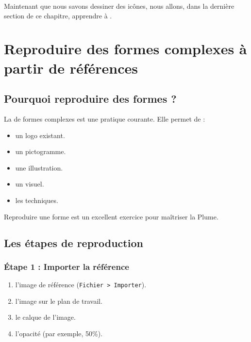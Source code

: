 Maintenant que nous savons dessiner des icônes, nous allons, dans la dernière section de ce chapitre, apprendre à .

\section{Reproduire des formes complexes à partir de références}

\subsection{Pourquoi reproduire des formes ?}

La  de formes complexes est une pratique courante. Elle permet de :

\begin{itemize}
    \item {} un logo existant.
    \item {} un pictogramme.
    \item {} une illustration.
    \item {} un visuel.
    \item {} les techniques.
\end{itemize}

Reproduire une forme est un excellent exercice pour maîtriser la Plume.

\subsection{Les étapes de reproduction}

\subsubsection{Étape 1 : Importer la référence}

\begin{enumerate}
    \item {} l'image de référence (\texttt{Fichier > Importer}).
    \item {} l'image sur le plan de travail.
    \item {} le calque de l'image.
    \item {} l'opacité (par exemple, 50\%).
\end{enumerate}


